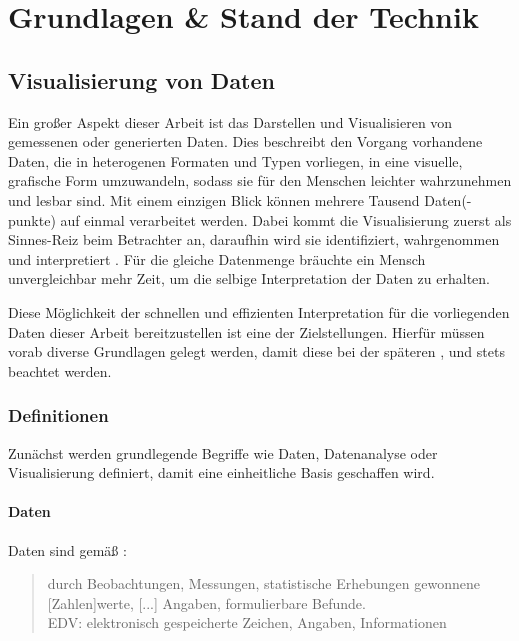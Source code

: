 \chapter{Grundlagen \& Stand der Technik}
\label{kap:Grundlagen}
\minitoc\pagebreak


\section{Visualisierung von Daten}
\label{sec:visual}
Ein großer Aspekt dieser Arbeit ist das Darstellen und Visualisieren von gemessenen oder generierten Daten.
Dies beschreibt den Vorgang vorhandene Daten, die in heterogenen Formaten und Typen vorliegen, in eine visuelle, grafische Form umzuwandeln, sodass sie für den Menschen leichter wahrzunehmen und lesbar sind.
Mit einem einzigen Blick können mehrere Tausend Daten(-punkte) auf einmal verarbeitet werden.
Dabei kommt die Visualisierung zuerst als Sinnes-Reiz beim Betrachter an, daraufhin wird sie identifiziert, wahrgenommen und interpretiert \cite{Goldstein.2015, FischerStabel.2018}.
Für die gleiche Datenmenge bräuchte ein Mensch unvergleichbar mehr Zeit, um die selbige Interpretation der Daten zu erhalten.

Diese Möglichkeit der schnellen und effizienten Interpretation für die vorliegenden Daten dieser Arbeit  bereitzustellen ist eine der Zielstellungen.
Hierfür müssen vorab diverse Grundlagen gelegt werden, damit diese bei der späteren ,  und  stets beachtet werden.

\subsection{Definitionen}
Zunächst werden grundlegende Begriffe wie Daten, Datenanalyse oder Visualisierung definiert, damit eine einheitliche Basis geschaffen wird.
\subsubsection{Daten}
Daten sind gemäß \cite{Dudenredaktion.2015}:
\begin{quote}
\glqq durch Beobachtungen, Messungen, statistische Erhebungen gewonnene [Zahlen]werte, [...] Angaben, formulierbare Befunde. \\
EDV: elektronisch gespeicherte Zeichen, Angaben, Informationen\grqq{}
\end{quote}


